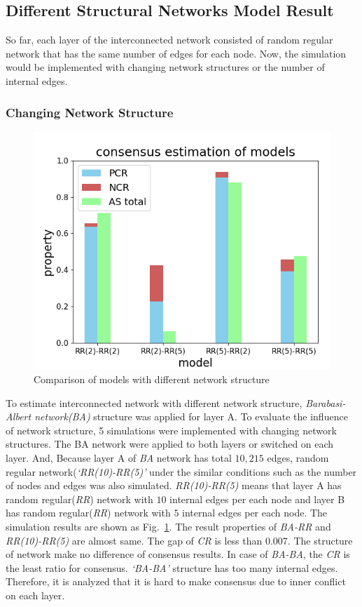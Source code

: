 \documentclass[english]{cccconf}
\begin{document}
\subsection{Different Structural Networks Model Result}
So far, each layer of the interconnected network consisted of random regular network that has the same number of edges for each node. Now, the simulation would be implemented with changing network structures or the number of internal edges. 
\subsubsection{Changing Network Structure}
\begin{figure}[!htb]
  \centering
  \includegraphics[width=\hsize]{FIG6.png}
  \caption{Comparison of models with different network structure}
  \label{Fig6}
\end{figure}
To estimate interconnected network with different network structure, \textit{Barabasi-Albert network(BA)} structure was applied for layer A\cite{barabasi1999, kimsangwoo2012}. To evaluate the influence of network structure, 5 simulations were implemented with changing network structures. The BA network were applied to both layers or switched on each layer. And, Because layer A of \textit{BA} network has total $10,215$ edges, random regular network(\textit{`RR(10)-RR(5)'} under the similar conditions such as the number of nodes and edges was also simulated.  \textit{RR(10)-RR(5)} means that layer A has random regular(\textit{RR}) network with $10$ internal edges per each node and layer B has random regular(\textit{RR}) network with $5$ internal edges per each node.  The simulation results are shown as Fig.~\ref{Fig6}. The result properties of \textit{BA-RR} and \textit{RR(10)-RR(5)} are almost same. The gap of \textit{CR} is less than 0.007. The structure of network make no difference of consensus results. In case of \textit{BA-BA}, the \textit{CR} is the least ratio for consensus. \textit{`BA-BA'} structure has too many internal edges. Therefore, it is analyzed that it is hard to make consensus due to inner conflict on each layer. 
\end{document}
